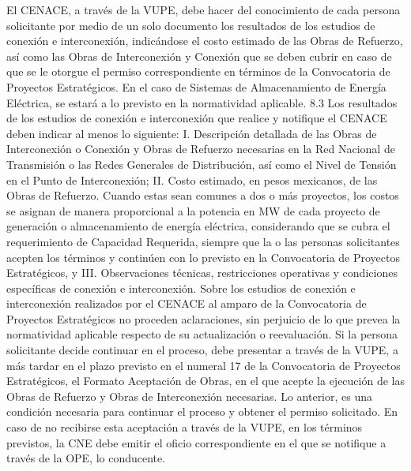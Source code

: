 El CENACE, a través de la VUPE, debe hacer del conocimiento de cada persona solicitante por medio de un solo documento los resultados de los estudios de conexión e interconexión, indicándose el costo estimado de las Obras de Refuerzo, así como las Obras de Interconexión y Conexión que se deben cubrir en caso de que se le otorgue el permiso correspondiente en términos de la Convocatoria de Proyectos Estratégicos. En el caso de Sistemas de Almacenamiento de Energía Eléctrica, se estará a lo previsto en la normatividad aplicable.
8.3 Los resultados de los estudios de conexión e interconexión que realice y notifique el CENACE deben indicar al menos lo siguiente:
I. Descripción detallada de las Obras de Interconexión o Conexión y Obras de Refuerzo necesarias en la Red Nacional de Transmisión o las Redes Generales de Distribución, así como el Nivel de Tensión en el Punto de Interconexión;
II. Costo estimado, en pesos mexicanos, de las Obras de Refuerzo. Cuando estas sean comunes a dos o más proyectos, los costos se asignan de manera proporcional a la potencia en MW de cada proyecto de generación o almacenamiento de energía eléctrica, considerando que se cubra el requerimiento de Capacidad Requerida, siempre que la o las personas solicitantes acepten los términos y continúen con lo previsto en la Convocatoria de Proyectos Estratégicos, y
III. Observaciones técnicas, restricciones operativas y condiciones específicas de conexión e interconexión.
Sobre los estudios de conexión e interconexión realizados por el CENACE al amparo de la Convocatoria de Proyectos Estratégicos no proceden aclaraciones, sin perjuicio de lo que prevea la normatividad aplicable respecto de su actualización o reevaluación.
Si la persona solicitante decide continuar en el proceso, debe presentar a través de la VUPE, a más tardar en el plazo previsto en el numeral 17 de la Convocatoria de Proyectos Estratégicos, el Formato Aceptación de Obras, en el que acepte la ejecución de las Obras de Refuerzo y Obras de Interconexión necesarias. Lo anterior, es una condición necesaria para continuar el proceso y obtener el permiso solicitado.
En caso de no recibirse esta aceptación a través de la VUPE, en los términos previstos, la CNE debe emitir el oficio correspondiente en el que se notifique a través de la OPE, lo conducente.
